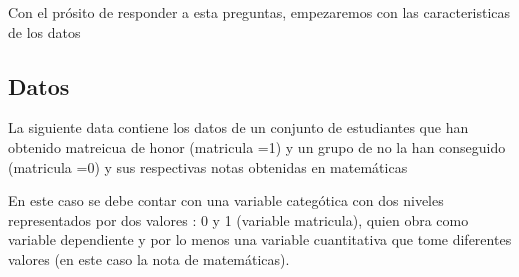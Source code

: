 \documentclass[
]{article}
\begin{document}
Con el prósito de responder a esta preguntas, empezaremos con las
caracteristicas de los datos

\hypertarget{datos}{%
\subsection{Datos}\label{datos}}

La siguiente data contiene los datos de un conjunto de estudiantes que
han obtenido matreicua de honor (matricula =1) y un grupo de no la han
conseguido (matricula =0) y sus respectivas notas obtenidas en
matemáticas

En este caso se debe contar con una variable categótica con dos niveles
representados por dos valores : 0 y 1 (variable matricula), quien obra
como variable dependiente y por lo menos una variable cuantitativa que
tome diferentes valores (en este caso la nota de matemáticas).
\end{document}
